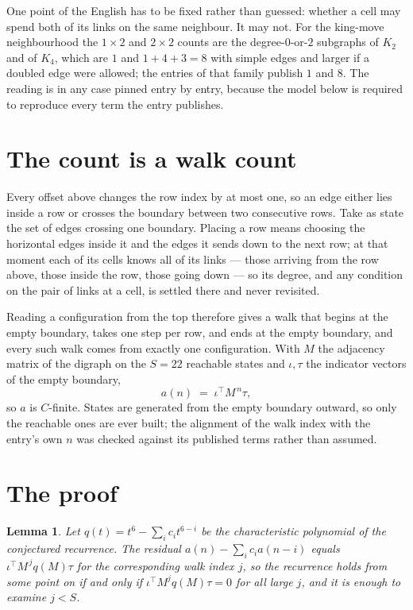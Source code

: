 \documentclass[11pt,a4paper]{article}
\theoremstyle{plain}
\newtheorem{lemma}[theorem]{Lemma}
\theoremstyle{definition}
\begin{document}
One point of the English has to be fixed rather than guessed: whether a cell may spend both of
its links on the same neighbour. It may not. For the king-move neighbourhood the $1\times2$
and $2\times2$ counts are the degree-$0$-or-$2$ subgraphs of $K_2$ and of $K_4$, which are $1$
and $1+4+3=8$ with simple edges and larger if a doubled edge were allowed; the entries of that
family publish $1$ and $8$. The reading is in any case pinned entry by entry, because the
model below is required to reproduce every term the entry publishes.


\section{The count is a walk count}

Every offset above changes the row index by at most one, so an edge either lies inside a row
or crosses the boundary between two consecutive rows. Take as state the set of edges crossing
one boundary. Placing a row means choosing the horizontal edges inside it and the edges it
sends down to the next row; at that moment each of its cells knows all of its links --- those
arriving from the row above, those inside the row, those going down --- so its degree, and any
condition on the pair of links at a cell, is settled there and never revisited.

Reading a configuration from the top therefore gives a walk that begins at the empty boundary,
takes one step per row, and ends at the empty boundary, and every such walk comes from exactly
one configuration. With $M$ the adjacency matrix of the digraph on the $S=22$ reachable
states and $\iota,\tau$ the indicator vectors of the empty boundary,
\[
a(n)\;=\;\iota^{\!\top}M^{\,n}\tau ,
\]
so $a$ is $C$-finite. States are generated from the empty boundary outward, so only the
reachable ones are ever built; the alignment of the walk index with the entry's own $n$ was
checked against its published terms rather than assumed.

\section{The proof}

\begin{lemma}\label{lem:crit}
Let $q(t)=t^{6}-\sum_i c_it^{6-i}$ be the characteristic polynomial of the
conjectured recurrence. The residual $a(n)-\sum_ic_ia(n-i)$ equals
$\iota^{\!\top}M^{\,j}q(M)\tau$ for the corresponding walk index $j$, so the recurrence
holds from some point on if and only if $\iota^{\!\top}M^{j}q(M)\tau=0$ for all large $j$,
and it is enough to examine $j<S$.
\end{lemma}
\end{document}
